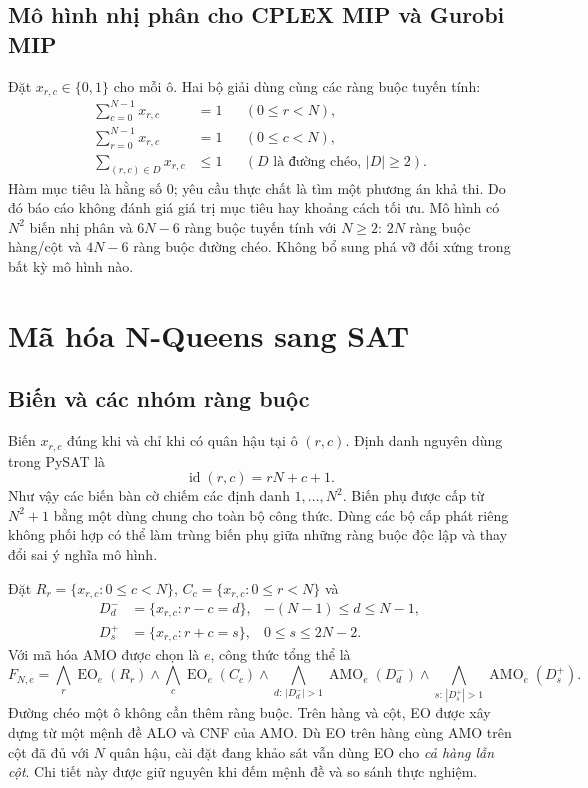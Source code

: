 \documentclass[a4paper,fleqn]{cas-sc}
\newcommand{\AMO}{\operatorname{AMO}}
\newcommand{\EO}{\operatorname{EO}}
\newcommand{\code}[1]{\texttt{\detokenize{#1}}}
\begin{document}
\subsection{Mô hình nhị phân cho CPLEX MIP và Gurobi MIP}\label{sec:mip}
Đặt $x_{r,c}\in\{0,1\}$ cho mỗi ô. Hai bộ giải dùng cùng các ràng buộc tuyến tính:
\begin{align}
 \sum_{c=0}^{N-1}x_{r,c}&=1 &&(0\leq r<N),\label{eq:miprow}\\
 \sum_{r=0}^{N-1}x_{r,c}&=1 &&(0\leq c<N),\\
 \sum_{(r,c)\in D}x_{r,c}&\leq1 &&(D\text{ là đường chéo, }|D|\geq2).
\end{align}
Hàm mục tiêu là hằng số $0$; yêu cầu thực chất là tìm một phương án khả thi. Do đó báo cáo không đánh giá giá trị mục tiêu hay khoảng cách tối ưu. Mô hình có $N^2$ biến nhị phân và $6N-6$ ràng buộc tuyến tính với $N\geq2$: $2N$ ràng buộc hàng/cột và $4N-6$ ràng buộc đường chéo. Không bổ sung phá vỡ đối xứng trong bất kỳ mô hình nào.

\section{Mã hóa N-Queens sang SAT}\label{sec:sat}
\subsection{Biến và các nhóm ràng buộc}
Biến $x_{r,c}$ đúng khi và chỉ khi có quân hậu tại ô $(r,c)$. Định danh nguyên dùng trong PySAT là
\begin{equation}\label{eq:id}
 \operatorname{id}(r,c)=rN+c+1.
\end{equation}
Như vậy các biến bàn cờ chiếm các định danh $1,\ldots,N^2$. Biến phụ được cấp từ $N^2+1$ bằng một \code{IDPool} dùng chung cho toàn bộ công thức. Dùng các bộ cấp phát riêng không phối hợp có thể làm trùng biến phụ giữa những ràng buộc độc lập và thay đổi sai ý nghĩa mô hình.

Đặt $R_r=\{x_{r,c}:0\leq c<N\}$, $C_c=\{x_{r,c}:0\leq r<N\}$ và
\begin{align}
 D^-_d&=\{x_{r,c}:r-c=d\},& -(N-1)\leq d\leq N-1,\\
 D^+_s&=\{x_{r,c}:r+c=s\},& 0\leq s\leq2N-2.
\end{align}
Với mã hóa AMO được chọn là $e$, công thức tổng thể là
\begin{equation}\label{eq:cnf}
 F_{N,e}=\bigwedge_r\EO_e(R_r)\land\bigwedge_c\EO_e(C_c)
 \land\bigwedge_{d:\,|D^-_d|>1}\AMO_e(D^-_d)
 \land\bigwedge_{s:\,|D^+_s|>1}\AMO_e(D^+_s).
\end{equation}
Đường chéo một ô không cần thêm ràng buộc. Trên hàng và cột, EO được xây dựng từ một mệnh đề ALO và CNF của AMO. Dù EO trên hàng cùng AMO trên cột đã đủ với $N$ quân hậu, cài đặt đang khảo sát vẫn dùng EO cho \emph{cả hàng lẫn cột}. Chi tiết này được giữ nguyên khi đếm mệnh đề và so sánh thực nghiệm.
\end{document}
